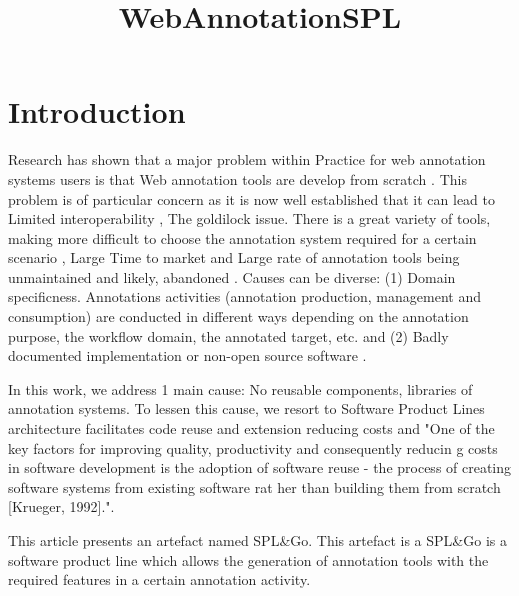 \documentclass{article}
\title{WebAnnotationSPL}
\author{}
\begin{document}
\maketitle
      

\section{Introduction}


    
Research has shown that a major problem within Practice for web annotation systems users is that Web annotation tools are develop from scratch \cite{Gayoso-Cabada2013}. This problem is of particular concern as it is now well established that it can lead to Limited interoperability \cite{Kalboussi2016}, The goldilock issue. There is a great variety of tools, making more difficult to choose the annotation system required for a certain scenario \cite{Kalboussi2016} \cite{CohenTOWARDSTHE}, Large Time to market \cite{CohenTOWARDSTHE} \cite{CohenTOWARDSTHE} and Large rate of annotation tools being unmaintained and likely, abandoned \cite{Neves2014}. Causes can be diverse: (1) Domain specificness. Annotations activities (annotation production, management and consumption) are conducted in different ways depending on the annotation purpose, the workflow domain, the annotated target, etc. \cite{Kalboussi2015} \cite{Kalboussi2016} \cite{Kalboussi2016} \cite{Ghadirian2018} and (2) Badly documented implementation or non-open source software \cite{Neves2019}. 
    

    
In this work, we address 1 main cause: No reusable components, libraries of annotation systems. To lessen this cause, we resort to Software Product Lines architecture facilitates code reuse and extension reducing costs and "One of the key factors for improving quality, productivity and consequently reducin g costs in software development is the adoption of software reuse - the process of creating software systems from existing software rat her than building them from scratch [Krueger, 1992].". 
    
This article presents an artefact named SPL&Go. This artefact is a SPL&Go is a software product line which allows the generation of annotation tools with the required features in a certain annotation activity. 
    
\end{document}
